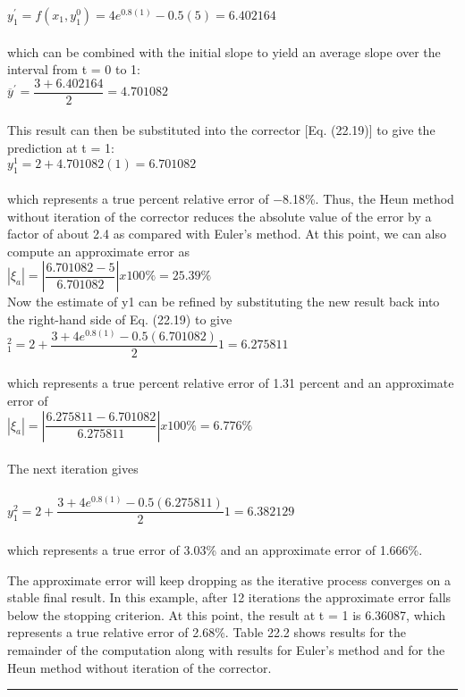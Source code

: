 \documentclass[../main.tex]{subfiles}
\begin{document}
$y^{'}_{1} = f(x_{1}, y^0_1) = 4e^{0.8(1)} - 0.5(5) = 6.402164$
\\
\\
which can be combined with the initial slope to yield an average slope over the interval
from t = 0 to 1:\\


$\overline{y}^{'} = \dfrac{3 + 6.402164}{2} = 4.701082$
\\
\\
This result can then be substituted into the corrector [Eq. (22.19)] to give the prediction at
t = 1:\\

$y^1_1 = 2 + 4.701082(1) = 6.701082$\\
\\
which represents a true percent relative error of −8.18\%. Thus, the Heun method without
iteration of the corrector reduces the absolute value of the error by a factor of about 2.4 as
compared with Euler's method. At this point, we can also compute an approximate error as\\

$ |\xi_{a}| = \left| \dfrac{6.701082 − 5}{6.701082} \right| x 100\% = 25.39\% $\\


Now the estimate of y1 can be refined by substituting the new result back into the
right-hand side of Eq. (22.19) to give\\

$^2_1 = 2 + \dfrac{3 + 4e^{0.8(1)} - 0.5(6.701082)}{2} 1 = 6.275811$\\
\\
which represents a true percent relative error of 1.31 percent and an approximate error of\\

$|\xi_{a}| = \left| \dfrac{6.275811 − 6.701082}{6.275811} \right| x 100\% = 6.776\%$\\
\\
The next iteration gives\\
\\
$y^2_1 = 2 + \dfrac{3 + 4e^{0.8(1)} - 0.5(6.275811)}{2}1 = 6.382129$\\
\\
which represents a true error of 3.03\% and an approximate error of 1.666\%.

The approximate error will keep dropping as the iterative process converges on a stable final result. In this example, after 12 iterations the approximate error falls below the
stopping criterion. At this point, the result at t = 1 is 6.36087, which represents a true relative error of 2.68\%. Table 22.2 shows results for the remainder of the computation along
with results for Euler's method and for the Heun method without iteration of the corrector.
\hrule
\end{document}
